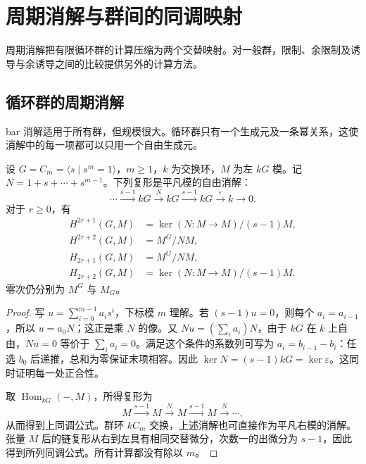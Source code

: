 
\section{周期消解与群间的同调映射}
\label{b4:sec:1103}

周期消解把有限循环群的计算压缩为两个交替映射。对一般群，限制、余限制及诱导与余诱导之间的比较提供另外的计算方法。

%
%

\subsection{循环群的周期消解}
\label{b4:subsec:1103:01}

bar 消解适用于所有群，但规模很大。循环群只有一个生成元及一条幂关系，这使消解中的每一项都可以只用一个自由生成元。

\begin{theorem}[循环群的周期消解]\label{b4:thm:cyclic-group-cohomology}
设 \(G=C_m=\langle s\mid s^m=1\rangle\)，\(m\ge1\)，\(k\) 为交换环，\(M\) 为左 \(kG\) 模。记 \(N=1+s+\cdots+s^{m-1}\)。下列复形是平凡模的自由消解：
\[
\cdots\xrightarrow{s-1}kG\xrightarrow{N}kG
\xrightarrow{s-1}kG\xrightarrow{\varepsilon}k\longrightarrow0.
\]
对于 \(r\ge0\)，有
\[
\begin{aligned}
H^{2r+1}(G,M)&=\ker(N:M\to M)/(s-1)M,\\
H^{2r+2}(G,M)&=M^G/NM,\\
H_{2r+1}(G,M)&=M^G/NM,\\
H_{2r+2}(G,M)&=\ker(N:M\to M)/(s-1)M.
\end{aligned}
\]
零次仍分别为 \(M^G\) 与 \(M_G\)。
\end{theorem}
\begin{proof}
写 \(u=\sum_{i=0}^{m-1}a_i s^i\)，下标模 \(m\) 理解。若 \((s-1)u=0\)，则每个 \(a_i=a_{i-1}\)，所以 \(u=a_0N\)；这正是乘 \(N\) 的像。又 \(Nu=(\sum_i a_i)N\)，由于 \(kG\) 在 \(k\) 上自由，\(Nu=0\) 等价于 \(\sum_i a_i=0\)。满足这个条件的系数列可写为 \(a_i=b_{i-1}-b_i\)：任选 \(b_0\) 后递推，总和为零保证末项相容。因此 \(\ker N=(s-1)kG=\ker\varepsilon\)。这同时证明每一处正合性。

取 \(\operatorname{Hom}_{kG}(-,M)\)，所得复形为
\[
M\xrightarrow{s-1}M\xrightarrow{N}M\xrightarrow{s-1}M\xrightarrow{N}\cdots,
\]
从而得到上同调公式。群环 \(kC_m\) 交换，上述消解也可直接作为平凡右模的消解。张量 \(M\) 后的链复形从右到左具有相同交替微分，次数一的出微分为 \(s-1\)，因此得到所列同调公式。所有计算都没有除以 \(m\)。
\end{proof}

